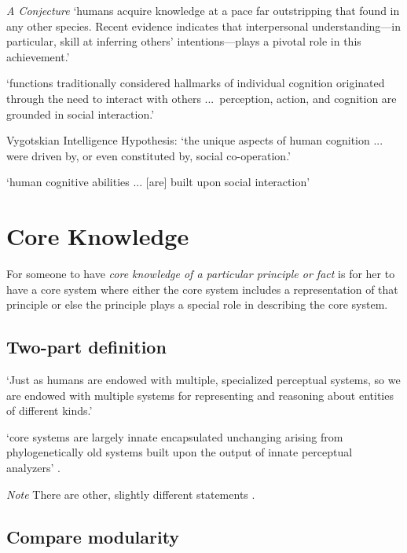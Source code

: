 \documentclass[12pt]{extarticle}
\begin{document}
\begin{multicols}{3}
\emph{A Conjecture}
‘humans acquire knowledge at a pace far outstripping that found in any other species. Recent evidence indicates that interpersonal understanding—in particular, skill at inferring others’ intentions—plays a pivotal role in this achievement.’
\citep[p.\ 40]{Baldwin:2000qq}
 
‘functions traditionally considered hallmarks of individual cognition originated through the need to interact with others ...\ perception, action, and cognition are grounded in social interaction.’
\citep[p.\ 103]{Knoblich:2006bn}
 
Vygotskian Intelligence Hypothesis:
‘the unique aspects of human cognition ... were driven by, or even constituted by, social co-operation.’
\citep[p.\ 1]{Moll:2007gu}
 
‘human cognitive abilities ... [are] built upon social interaction’
\citep{sinigaglia:2008_roots} %
 
 
 
\section{Core Knowledge}
 
For someone to have \textit{core knowledge of a particular principle or fact} is for her to have a core system where either the core system includes a representation of that principle or else the principle plays a special role in describing the core system.
 
\subsection{Two-part definition}
 
‘Just as humans are endowed with multiple, specialized perceptual systems, so we are endowed with multiple systems for representing and reasoning about entities of different kinds.’
\citep[p.\ 517]{Carey:1996hl}
 
‘core systems are
largely innate
encapsulated
unchanging
arising from phylogenetically old systems
built upon the output of innate perceptual analyzers’
\citep[p.\ 520]{Carey:1996hl}.
 
\textit{Note} There are other, slightly different statements \citep[e.g.][]{carey:2009_origin}.
 
\subsection{Compare modularity}
 

\end{multicols}
\end{document}

